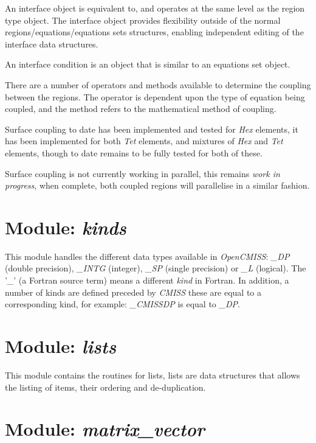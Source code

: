 An interface object is equivalent to, and operates at the same level as 
the region type object. The interface object provides flexibility outside 
of the normal regions/equations/equations sets structures, enabling 
independent editing of the interface data structures.

An interface condition is an object that is similar to an equations set 
object. 

There are a number of operators and methods available to determine the 
coupling between the regions. The operator is dependent upon the type of 
equation being coupled, and the method refers to the mathematical method of 
coupling.

Surface coupling to date has been implemented and tested for \emph{Hex} 
elements, it has been implemented for both \emph{Tet} elements, and mixtures 
of \emph{Hex} and \emph{Tet} elements, though to date remains to be fully 
tested for both of these.

Surface coupling is not currently working in parallel, this remains 
\emph{work in progress}, when complete, both coupled regions will 
parallelise in a similar fashion.


\section{Module: \emph{kinds}}
\label{sec:kinds}

This module handles the different data types available in \emph{OpenCMISS}: 
\emph{\_DP} (double precision), \emph{\_INTG} (integer), \emph{\_SP} (single 
precision) or \emph{\_L} (logical). The '\emph{\_}' (a Fortran source term) 
means a different \emph{kind} in Fortran. In addition, a number of kinds 
are defined preceded by \emph{CMISS} these are equal to a corresponding 
kind, for example: \emph{\_CMISSDP} is equal to \emph{\_DP}. 


\section{Module: \emph{lists}}
\label{sec:lists}

This module contains the routines for lists, lists are data structures that 
allows the listing of items, their ordering and de-duplication.


\section{Module: \emph{matrix\_vector}}
\label{sec:matrixvector}

